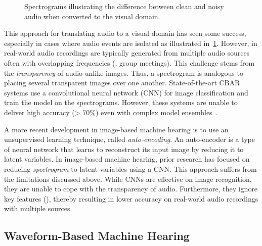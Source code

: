 \begin{figure}[!tbp]
    \centering
    \hfill
    \caption{Spectrograms illustrating the difference between clean and noisy audio when converted to the visual domain.}
    \label{fig:noisy-audio-cmpr}
\end{figure}

This approach for translating audio to a visual domain has seen some success,
especially in cases where audio events are isolated as illustrated
in~\cref{fig:noisy-audio-cmpr}.
However, in real-world audio recordings are typically generated from multiple
audio sources often with overlapping frequencies (\eg, group meetings).
This challenge stems from the \textit{transparency} of audio unlike images. 
Thus, a spectrogram is analogous to placing several transparent images 
over one another. 
State-of-the-art CBAR systems use a convolutional neural network (CNN) for 
image classification and
train the model on the spectrograms.
However, these systems are unable to deliver high accuracy (> 70\%) even with
complex model ensembles~\cite{xu-large-scale-2018,piczak-environmental-2015}.

A more recent development in image-based machine hearing is to use an
unsupervised learning technique, called \textit{auto-encoding}. 
An auto-encoder is a type of neural network that learns to reconstruct its 
input image by reducing it to latent variables.
In image-based machine hearing, prior research has focused on reducing 
\textit{spectrogram} to latent variables using a CNN.
This approach suffers from the limitations discussed above.
While CNNs are effective on image recognition, they are unable to cope with the
transparency of audio. Furthermore, they ignore key features (),
thereby resulting in lower accuracy on real-world audio recordings with
multiple sources.

\subsection{Waveform-Based Machine Hearing}

